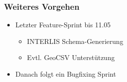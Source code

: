 \documentclass[class=scrbook,crop=false]{standalone}
\begin{document}
	\subsubsection*{Weiteres Vorgehen}
	\begin{itemize}
		\item Letzter Feature-Sprint bis 11.05
		\begin{itemize}
			\item INTERLIS Schema-Generierung
			\item Evtl. GeoCSV Unterstützung
		\end{itemize}
		\item Danach folgt ein Bugfixing Sprint
	\end{itemize}
\end{document}

